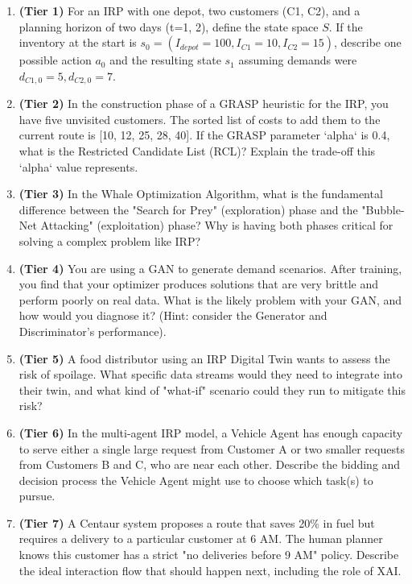 \documentclass{article}
\begin{document}
\begin{enumerate}[label=\textbf{Q\arabic*:}, wide, labelindent=0pt]
    \item \textbf{(Tier 1)} For an IRP with one depot, two customers (C1, C2), and a planning horizon of two days (t=1, 2), define the state space $S$. If the inventory at the start is $s_0 = (I_{depot}=100, I_{C1}=10, I_{C2}=15)$, describe one possible action $a_0$ and the resulting state $s_1$ assuming demands were $d_{C1,0}=5, d_{C2,0}=7$.
    
    \item \textbf{(Tier 2)} In the construction phase of a GRASP heuristic for the IRP, you have five unvisited customers. The sorted list of costs to add them to the current route is [10, 12, 25, 28, 40]. If the GRASP parameter `alpha` is 0.4, what is the Restricted Candidate List (RCL)? Explain the trade-off this `alpha` value represents.
    
    \item \textbf{(Tier 3)} In the Whale Optimization Algorithm, what is the fundamental difference between the "Search for Prey" (exploration) phase and the "Bubble-Net Attacking" (exploitation) phase? Why is having both phases critical for solving a complex problem like IRP?
    
    \item \textbf{(Tier 4)} You are using a GAN to generate demand scenarios. After training, you find that your optimizer produces solutions that are very brittle and perform poorly on real data. What is the likely problem with your GAN, and how would you diagnose it? (Hint: consider the Generator and Discriminator's performance).
    
    \item \textbf{(Tier 5)} A food distributor using an IRP Digital Twin wants to assess the risk of spoilage. What specific data streams would they need to integrate into their twin, and what kind of "what-if" scenario could they run to mitigate this risk?
    
    \item \textbf{(Tier 6)} In the multi-agent IRP model, a Vehicle Agent has enough capacity to serve either a single large request from Customer A or two smaller requests from Customers B and C, who are near each other. Describe the bidding and decision process the Vehicle Agent might use to choose which task(s) to pursue.
    
    \item \textbf{(Tier 7)} A Centaur system proposes a route that saves 20\% in fuel but requires a delivery to a particular customer at 6 AM. The human planner knows this customer has a strict "no deliveries before 9 AM" policy. Describe the ideal interaction flow that should happen next, including the role of XAI.
    

\end{enumerate}
\end{document}
